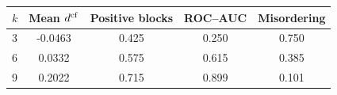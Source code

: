 \begin{tabular}{lcccc}
\toprule
$k$ & Mean $d^{\rm cf}$ & Positive blocks & ROC--AUC & Misordering \\
\midrule
3 & -0.0463 & 0.425 & 0.250 & 0.750 \\
6 & 0.0332 & 0.575 & 0.615 & 0.385 \\
9 & 0.2022 & 0.715 & 0.899 & 0.101 \\
\bottomrule
\end{tabular}
